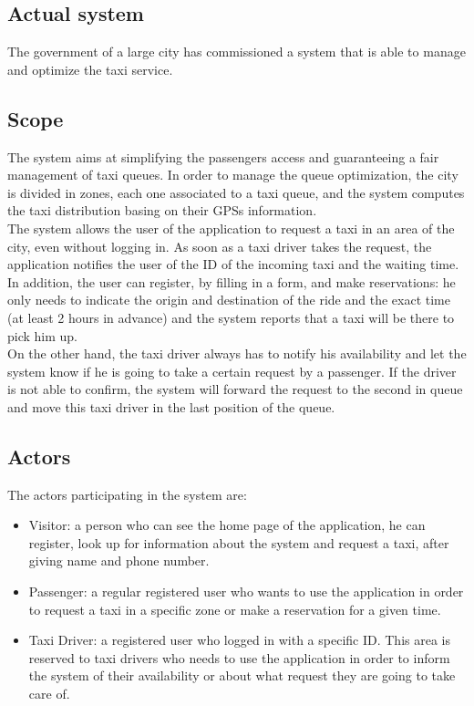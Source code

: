 \documentclass[18pt,oneside,a4paper, titlepage]{article}
\begin{document}
	\subsection{Actual system}
		The government of a large city has commissioned a system that is able to manage and optimize the taxi service.
	
	\subsection{Scope}
		The system aims at simplifying the passengers access and guaranteeing a fair management of taxi queues.
		In order to manage the queue optimization, the city is divided in zones, each one associated to a taxi queue, and the system computes the taxi distribution basing on their GPSs information.	\\	
		The system allows the user of the application to request a taxi in an area of the city, even without logging in. As soon as a taxi driver takes the request, the application notifies the user of the ID of the incoming taxi and the waiting time. In addition, the user can register, by filling in a form, and make reservations: he only needs to indicate the origin and destination of the ride and the exact time (at least 2 hours in advance) and the system reports that a taxi will be there to pick him up.\\
		On the other hand, the taxi driver always has to notify his availability and let the system know if he is going to take a certain request by a passenger. If the driver is not able to confirm, the system will forward the request to the second in queue and move this taxi driver in the last position of the queue.
	
	\subsection{Actors}
		The actors participating in the system are:
	\begin{itemize}
		\item Visitor: a person who can see the home page of the application, he can register, look up for information about the system and request a taxi, after giving name and phone number. 
		\item Passenger: a regular registered user who wants to use the application in order to request a taxi in a specific zone or make a reservation for a given time.
		\item Taxi Driver: a registered user who logged in with a specific ID. This area is reserved to taxi drivers who needs to use the application in order to inform the system of their availability or about what request they are going to take care of.
	\end{itemize}
	
\end{document}
